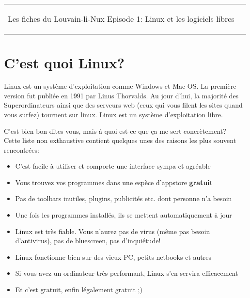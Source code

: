 



\begin{tabular}{p{13cm}r}
	\begin{center}{\Large Les fiches du Louvain-li-Nux\linebreak \linebreak
	\LARGE Episode 1: Linux et les logiciels libres}\end{center}
		&
	\usebox{\logollnux}
\end{tabular}


\section*{C'est quoi Linux?}

Linux est un système d'exploitation comme Windows et Mac OS. La première version fut publiée en 1991 par Linus Thorvalds.
Au jour d'hui, la majorité des Superordinateurs ainsi que des serveurs web (ceux qui vous filent les sites quand vous surfez)
tournent sur linux. Linux est un système d'exploitation libre.
\vspace{0.5cm}

C'est bien bon dites vous, mais à quoi est-ce que ça me sert concrètement?\\
Cette liste non exthaustive contient quelques unes des raisons les plus souvent rencontrées:
\begin{itemize}
\item C'est facile à utiliser et comporte une interface sympa et agréable
\item Vous trouvez vos programmes dans une espèce d'appstore \textbf{gratuit}
\item Pas de toolbars inutiles, plugins, publicités etc. dont personne n'a besoin
\item Une fois les programmes installés, ils se mettent automatiquement à jour
\item Linux est très fiable. Vous n'aurez pas de virus (même pas besoin d'antivirus),
pas de bluescreen, pas d'inquiétude!
\item Linux fonctionne bien sur des vieux PC, petits netbooks et autres
\item Si vous avez un ordinateur très performant, Linux s'en servira efficacement
\item Et c'est gratuit, enfin légalement gratuit ;)
\end{itemize}

